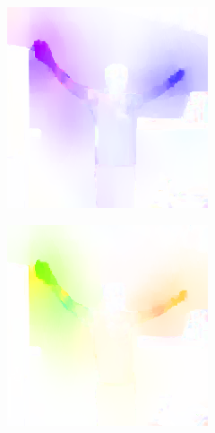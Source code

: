 \begin{figure}[!ht]
    \begin{subfigure}[b]{0.24\textwidth}
        \includegraphics[width=\linewidth]{figures/optical_flow/image000000312.png}
        \caption{}
        \label{fig:optical-flow-a}
    \end{subfigure}
    \begin{subfigure}[b]{0.24\textwidth}
        \includegraphics[width=\linewidth]{figures/optical_flow/image000000386.png}

\end{subfigure}
\end{figure}
